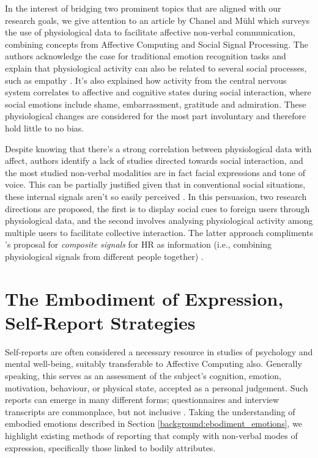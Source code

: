 In the interest of bridging two prominent topics that are aligned with our research goals, we give attention to an article by Chanel and Mühl \cite{chanel_connecting_2015} which surveys the use of physiological data to facilitate affective non-verbal communication, combining concepts from Affective Computing and Social Signal Processing. The authors acknowledge the case for traditional emotion recognition tasks and explain that physiological activity can also be related to several social processes, such as empathy \cite{levenson_empathy_1992}. It's also explained how activity from the central nervous system correlates to affective and cognitive states during social interaction, where social emotions include shame, embarrassment, gratitude and admiration. These physiological changes are considered for the most part involuntary and therefore hold little to no bias.

Despite knowing that there's a strong correlation between physiological data with affect, authors identify a lack of studies directed towards social interaction, and the most studied non-verbal modalities are in fact facial expressions and tone of voice. This can be partially justified given that in conventional social situations, these internal signals aren't so easily perceived \cite{vinciarelli_social_2009}. In this persuasion, two research directions are proposed, the first is to display social cues to foreign users through physiological data, and the second involves analysing physiological activity among multiple users to facilitate collective interaction. The latter approach compliments \citeauthor{slovak_understanding_2012}'s proposal for \textit{composite signals} for HR as information (i.e., combining physiological signals from different people together) \cite{slovak_understanding_2012}.

\section{The Embodiment of Expression, Self-Report Strategies}
\label{lit_review:self_report}

Self-reports are often considered a necessary resource in studies of psychology and mental well-being, suitably transferable to Affective Computing also. Generally speaking, this serves as an assessment of the subject's cognition, emotion, motivation, behaviour, or physical state, accepted as a personal judgement. Such reports can emerge in many different forms; questionnaires and interview transcripts are commonplace, but not inclusive \cite{barker_self-report_2016}. Taking the understanding of embodied emotions described in Section \ref{background:ebodiment_emotions}, we highlight existing methods of reporting that comply with non-verbal modes of expression, specifically those linked to bodily attributes.

